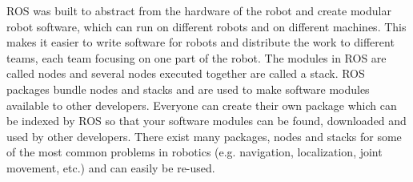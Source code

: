 \begin{figure}[ht]
\centering
{}
\end{figure}

ROS was built to abstract from the hardware of the robot and create modular robot software, which can run on different robots and on different machines. This makes it easier to write software for robots and distribute the work to different teams, each team focusing on one part of the robot. The modules in ROS are called nodes and several nodes executed together are called a stack. ROS packages bundle nodes and stacks and are used to make software modules available to other developers. Everyone can create their own package which can be indexed by ROS so that your software modules can be found, downloaded and used by other developers. There exist many packages, nodes and stacks for some of the most common problems in robotics (e.g. navigation, localization, joint movement, etc.) and can easily be re-used.


